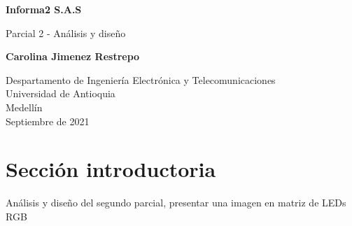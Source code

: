 \documentclass{article}
\begin{document}
\begin{titlepage}
    \begin{center}
        \vspace*{1cm}
            
        \Huge
        \textbf{Informa2 S.A.S}
            
        \vspace{0.5cm}
        \LARGE
        Parcial 2 - Análisis y diseño 
            
        \vspace{1.5cm}
            
        \textbf{Carolina Jimenez Restrepo}
            
        \vfill
            
        \vspace{0.8cm}
            
        \Large
        Despartamento de Ingeniería Electrónica y Telecomunicaciones\\
        Universidad de Antioquia\\
        Medellín\\
        Septiembre de 2021
            
    \end{center}
\end{titlepage}

\tableofcontents
\newpage
\section{Sección introductoria}\label{intro}
Análisis y diseño del segundo parcial, presentar una imagen en matriz de LEDs RGB 
\end{document}

